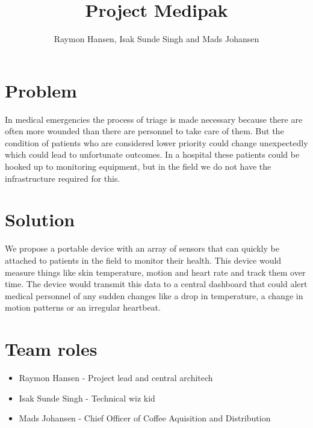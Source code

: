 

\title{Project Medipak}
\author{Raymon Hansen, Isak Sunde Singh and Mads Johansen}


\maketitle

\section*{Problem}
In medical emergencies the process of triage is made necessary because there are often more wounded than there are personnel to take care of them. But the condition of patients who are considered lower priority could change unexpectedly which could lead to unfortunate outcomes. In a hospital these patients could be hooked up to monitoring equipment, but in the field we do not have the infrastructure required for this.

\section*{Solution}
We propose a portable device with an array of sensors that can quickly be attached to patients in the field to monitor their health. This device would measure things like skin temperature, motion and heart rate and track them over time. The device would transmit this data to a central dashboard that could alert medical personnel of any sudden changes like a drop in temperature, a change in motion patterns or an irregular heartbeat.

\section*{Team roles}
\begin{itemize}
\item Raymon Hansen - Project lead and central architech
\item Isak Sunde Singh - Technical wiz kid
\item Mads Johansen - Chief Officer of Coffee Aquisition and Distribution
\end{itemize}


